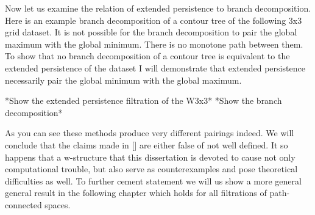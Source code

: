 Now let us examine the relation of extended persistence to branch decomposition. Here is an example branch decomposition of a contour tree of the following 3x3 grid dataset. It is not possible for the branch decomposition to pair the global maximum with the global minimum. There is no monotone path between them. To show that no branch decomposition of a contour tree is equivalent to the extended persistence of the dataset I will demonstrate that extended persistence necessarily pair the global minimum with the global maximum. 

*Show the extended persistence filtration of the W3x3*
*Show the branch decomposition*


As you can see these methods produce very different pairings indeed. We will conclude that the claims made in [] are either false of not well defined. It so happens that a w-structure that this dissertation is devoted to cause not only computational trouble, but also serve as counterexamples and pose theoretical difficulties as well. To further cement statement we will us show a more general general result in the following chapter which holds for all filtrations of path-connected spaces.











